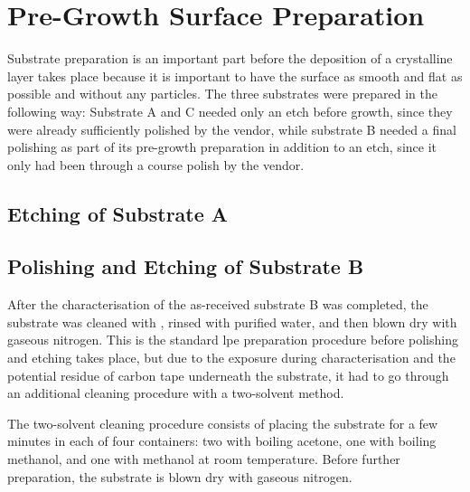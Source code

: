 \section{Pre-Growth Surface Preparation}
Substrate preparation is an important part before the deposition of a crystalline layer takes place because it is important to have the surface as smooth and flat as possible and without any particles. The three substrates were prepared in the following way: Substrate A and C needed only an etch before growth, since they were already sufficiently polished by the vendor, while substrate B needed a final polishing as part of its pre-growth preparation in addition to an etch, since it only had been through a course polish by the vendor.

\subsection{Etching of Substrate A}\label{sec:subA_etch}


\subsection{Polishing and Etching of Substrate B}

After the characterisation of the as-received substrate B was completed, the substrate was cleaned with , rinsed with purified water, and then blown dry with gaseous nitrogen. This is the standard \ac{lpe} preparation procedure before polishing and etching takes place, but due to the exposure during characterisation and the potential residue of carbon tape underneath the substrate, it had to go through an additional cleaning procedure with a two-solvent method.%

The two-solvent cleaning procedure consists of placing the substrate for a few minutes in each of four containers: two with boiling acetone, one with boiling methanol, and one with methanol at room temperature. Before further preparation, the substrate is blown dry with gaseous nitrogen. %


